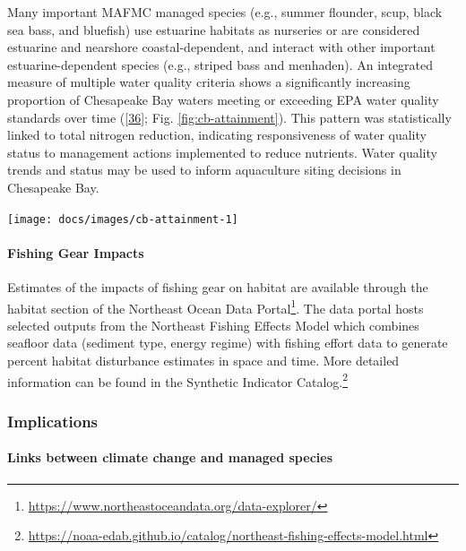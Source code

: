 \documentclass[
  10pt,
]{article}
\let\origfigure\figure
\let\endorigfigure\endfigure
\renewenvironment{figure}[1][2] {
    \expandafter\origfigure\expandafter[H]
} {
    \endorigfigure
}
\begin{document}
Many important MAFMC managed species (e.g., summer flounder, scup, black
sea bass, and bluefish) use estuarine habitats as nurseries or are
considered estuarine and nearshore coastal-dependent, and interact with
other important estuarine-dependent species (e.g., striped bass and
menhaden). An integrated measure of multiple water quality criteria
shows a significantly increasing proportion of Chesapeake Bay waters
meeting or exceeding EPA water quality standards over time
({[}\protect\hyperlink{ref-zhang_chesapeake_2018}{36}{]}; Fig.
\ref{fig:cb-attainment}). This pattern was statistically linked to total
nitrogen reduction, indicating responsiveness of water quality status to
management actions implemented to reduce nutrients. Water quality trends
and status may be used to inform aquaculture siting decisions in
Chesapeake Bay.

\begin{figure}

{\centering \texttt{[image: docs/images/cb-attainment-1]} 

}

\caption{Water quality attainment in Chesapeake Bay following rolling three year assessment periods.}\label{fig:cb-attainment}
\end{figure}

\hypertarget{fishing-gear-impacts}{%
\paragraph{Fishing Gear Impacts}\label{fishing-gear-impacts}}

Estimates of the impacts of fishing gear on habitat are available
through the habitat section of the Northeast Ocean Data
Portal\footnote{\url{https://www.northeastoceandata.org/data-explorer/}}.
The data portal hosts selected outputs from the Northeast Fishing
Effects Model which combines seafloor data (sediment type, energy
regime) with fishing effort data to generate percent habitat disturbance
estimates in space and time. More detailed information can be found in
the Synthetic Indicator Catalog.\footnote{\url{https://noaa-edab.github.io/catalog/northeast-fishing-effects-model.html}}

\hypertarget{implications-6}{%
\subsubsection{Implications}\label{implications-6}}

\hypertarget{links-between-climate-change-and-managed-species}{%
\paragraph{Links between climate change and managed
species}\label{links-between-climate-change-and-managed-species}}
\end{document}
